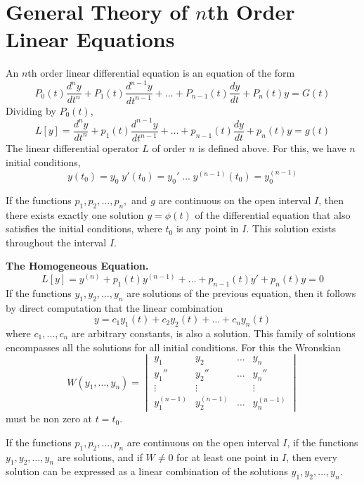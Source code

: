 \section{General Theory of $n$th Order Linear Equations}
    An $n$th order linear differential equation is an equation of the form
    $$P_0(t)\dfrac{d^ny}{dt^n} + P_1(t)\dfrac{d^{n - 1}y}{dt^{n - 1}} + \dots + P_{n-1}(t)\dfrac{dy}{dt} + P_n(t)y = G(t)$$
    Dividing by $P_0(t)$,
    $$L[y] = \dfrac{d^ny}{dt^n} + p_1(t)\dfrac{d^{n - 1}y}{dt^{n - 1}} + \dots + p_{n-1}(t)\dfrac{dy}{dt} + p_n(t)y = g(t)$$
    The linear differential operator $L$ of order $n$ is defined above.
    \newline \indent
    For this, we have $n$ initial conditions,
    $$y(t_0) = y_0 \; y'(t_0) = y_0' \; \dots \; y^(n-1)(t_0) = y_0^(n-1)$$
    \begin{theorem}
        If the functions $p_1,p_2,\dots,p_n,$ and $g$ are continuous on the open interval $I$, then there exists exactly one solution $y = \phi(t)$ of the differential equation that also satisfies the initial conditions, where $t_0$ is any point in $I$. This solution exists throughout the interval $I$.
    \end{theorem}
    \textbf{The Homogeneous Equation.} 
    $$L[y] = y^{(n)} + p_1(t)y^{(n-1)} + \dots + p_{n-1}(t)y' + p_n(t)y = 0$$
    If the functions $y_1, y_2, \dots, y_n$ are solutions of the previous equation, then it follows by direct computation that the linear combination
    $$y = c_1y_1(t) + c_2y_2(t) + \dots + c_ny_n(t)$$
    where $c_1,\dots,c_n$ are arbitrary constants, is also a solution. This family of solutions encompasses all the solutions for all initial conditions. For this the Wronskian
    \begin{equation*}
        W(y_1,\dots,y_n) = \begin{vmatrix}
            y_1 & y_2 & \dots & y_n \\
            y_1'' & y_2'' & \dots & y_n'' \\
            \vdots & \vdots &  & \vdots \\
            y_1^{(n-1)} & y_2^{(n-1)} & \dots & y_n^{(n-1)}
        \end{vmatrix}
    \end{equation*}
    must be non zero at $t = t_0$.
    \begin{theorem}
        If the functions $p_1,p_2,\dots,p_n$ are continuous on the open interval $I$, if the functions $y_1,y_2,\dots,y_n$ are solutions, and if $W \neq 0$ for at least one point in $I$, then every solution can be expressed as a linear combination of the solutions $y_1, y_2,\dots,y_n$.
    \end{theorem}
